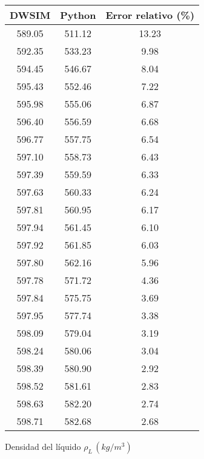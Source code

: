 \begin{figure}[H]
    \centering
    \caption{Densidad del líquido $\rho_L \, (kg/m^3)$}
    \small
    \begin{tabular}{|c|c|c|}
        \hline
        \textbf{DWSIM} & \textbf{Python} & Error relativo (\%) \\
        \hline
        589.05         & 511.12          & 13.23               \\
        \hline
        592.35         & 533.23          & 9.98                \\
        \hline
        594.45         & 546.67          & 8.04                \\
        \hline
        595.43         & 552.46          & 7.22                \\
        \hline
        595.98         & 555.06          & 6.87                \\
        \hline
        596.40         & 556.59          & 6.68                \\
        \hline
        596.77         & 557.75          & 6.54                \\
        \hline
        597.10         & 558.73          & 6.43                \\
        \hline
        597.39         & 559.59          & 6.33                \\
        \hline
        597.63         & 560.33          & 6.24                \\
        \hline
        597.81         & 560.95          & 6.17                \\
        \hline
        597.94         & 561.45          & 6.10                \\
        \hline
        597.92         & 561.85          & 6.03                \\
        \hline
        597.80         & 562.16          & 5.96                \\
        \hline
        597.78         & 571.72          & 4.36                \\
        \hline
        597.84         & 575.75          & 3.69                \\
        \hline
        597.95         & 577.74          & 3.38                \\
        \hline
        598.09         & 579.04          & 3.19                \\
        \hline
        598.24         & 580.06          & 3.04                \\
        \hline
        598.39         & 580.90          & 2.92                \\
        \hline
        598.52         & 581.61          & 2.83                \\
        \hline
        598.63         & 582.20          & 2.74                \\
        \hline
        598.71         & 582.68          & 2.68                \\
        \hline
    \end{tabular}
    \normalsize
\end{figure}

